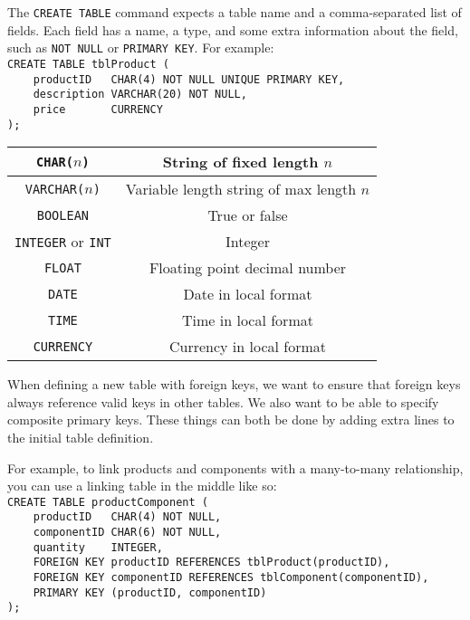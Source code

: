 \documentclass[../main.tex]{subfile}
\begin{document}


The \texttt{CREATE TABLE} command expects a table name and a comma-separated list of fields. Each field has a name, a type, and some extra information about the field, such as \texttt{NOT NULL} or \texttt{PRIMARY KEY}. For example:\\
\texttt{CREATE TABLE tblProduct (\\
    productID   CHAR(4) NOT NULL UNIQUE PRIMARY KEY,\\
    description VARCHAR(20) NOT NULL,\\
    price       CURRENCY\\
);}


\begin{center}
\begin{tabular}{|c|c|}
	\hline
	\texttt{CHAR(}$n$\texttt{)} & String of fixed length $n$\\
	\hline
	\texttt{VARCHAR(}$n$\texttt{)} & Variable length string of max length $n$\\
	\hline
	\texttt{BOOLEAN} & True or false\\
	\hline
	\texttt{INTEGER} or \texttt{INT} & Integer\\
	\hline
	\texttt{FLOAT} & Floating point decimal number\\
	\hline
	\texttt{DATE} & Date in local format\\
	\hline
	\texttt{TIME} & Time in local format\\
	\hline
	\texttt{CURRENCY} & Currency in local format\\
	\hline
\end{tabular}
\end{center}


When defining a new table with foreign keys, we want to ensure that foreign keys always reference valid keys in other tables. We also want to be able to specify composite primary keys. These things can both be done by adding extra lines to the initial table definition.

For example, to link products and components with a many-to-many relationship, you can use a linking table in the middle like so:\\
\texttt{CREATE TABLE productComponent (\\
    productID   CHAR(4) NOT NULL,\\
    componentID CHAR(6) NOT NULL,\\
    quantity    INTEGER,\\
    FOREIGN KEY productID REFERENCES tblProduct(productID),\\
    FOREIGN KEY componentID REFERENCES tblComponent(componentID),\\
    PRIMARY KEY (productID, componentID)\\
);}
\end{document}
